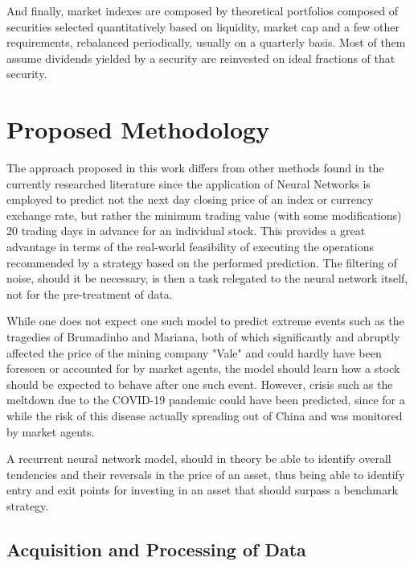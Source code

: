 \documentclass[conference]{IEEEtran}
\begin{document}
And finally, market indexes are composed by theoretical portfolios composed of securities selected quantitatively based on liquidity, market cap and a few other requirements, rebalanced periodically, usually on a quarterly basis. Most of them assume dividends yielded by a security are reinvested on ideal fractions of that security.

\section{Proposed Methodology}

The approach proposed in this work differs from other methods found in the currently researched literature since the application of Neural Networks is employed to predict not the next day closing price of an index or currency exchange rate, but rather the minimum trading value (with some modifications) 20 trading days in advance for an individual stock. This provides a great advantage in terms of the real-world feasibility of executing the operations recommended by a strategy based on the performed prediction. The filtering of noise, should it be necessary, is then a task relegated to the neural network itself, not for the pre-treatment of data. 

While one does not expect one such model to predict extreme events such as the tragedies of Brumadinho and Mariana, both of which significantly and abruptly affected the price of the mining company "Vale" and could hardly have been foreseen or accounted for by market agents, the model should learn how a stock should be expected to behave after one such event. However, crisis such as the meltdown due to the COVID-19 pandemic could have been predicted, since for a while the risk of this disease actually spreading out of China and was monitored by market agents.

A recurrent neural network model, should in theory be able to identify overall tendencies and their reversals in the price of an asset, thus being able to identify entry and exit points for investing in an asset that should surpass a benchmark strategy.



\subsection{Acquisition and Processing of Data}
\end{document}
